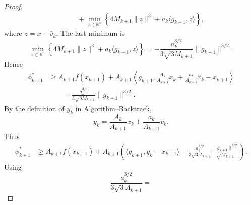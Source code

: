 \begin{itemize}
{\begin{proof}
\begin{align*}
                       & \qquad
                      +
                      \min_{z\in\mathbb R^n}
                      \left\{
                      4M_{k+1}\|z\|^3
                      +
                      a_k\langle g_{k+1},z\rangle
                      \right\},
                  \end{align*}
                  where \(z=x-\widehat v_k\). The last minimum is
                  \[
                      \min_{z\in\mathbb R^n}
                      \left\{
                      4M_{k+1}\|z\|^3
                      +
                      a_k\langle g_{k+1},z\rangle
                      \right\}
                      =
                      -
                      \frac{a_k^{3/2}}{3\sqrt{3M_{k+1}}}
                      \|g_{k+1}\|^{3/2}.
                  \]
                  Hence
                  \begin{align*}
                      \phi_{k+1}^*
                       & \ge
                      A_{k+1}f(x_{k+1})
                      +
                      A_{k+1}
                      \left\langle
                      g_{k+1},
                      \frac{A_k}{A_{k+1}}x_k
                      +
                      \frac{a_k}{A_{k+1}}\widehat v_k
                      -
                      x_{k+1}
                      \right\rangle \\
                       & \qquad
                      -
                      \frac{a_k^{3/2}}{3\sqrt{3M_{k+1}}}
                      \|g_{k+1}\|^{3/2}.
                  \end{align*}
                  By the definition of \(y_k\) in Algorithm--Backtrack,
                  \[
                      y_k
                      =
                      \frac{A_k}{A_{k+1}}x_k
                      +
                      \frac{a_k}{A_{k+1}}\widehat v_k.
                  \]
                  Thus
                  \begin{align*}
                      \phi_{k+1}^*
                       & \ge
                      A_{k+1}f(x_{k+1})
                      +
                      A_{k+1}
                      \left(
                      \langle g_{k+1},y_k-x_{k+1}\rangle
                      -
                      \frac{a_k^{3/2}}{3\sqrt{3}A_{k+1}}
                      \frac{\|g_{k+1}\|^{3/2}}{\sqrt{M_{k+1}}}
                      \right).
                  \end{align*}
                  Using
                  \[
                      \frac{a_k^{3/2}}{3\sqrt{3}A_{k+1}}
                      =
\]
\end{proof}}
\end{itemize}
